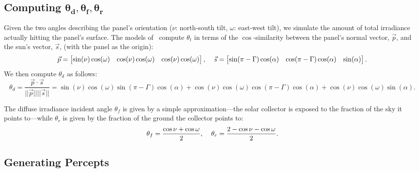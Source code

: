 \documentclass{article}
\begin{document}
\subsection{Computing $\pmb{\theta_d, \theta_f, \theta_r}$}
Given the two angles describing the panel's orientation ($\nu$: north-south tilt, $\omega$: east-west tilt), we simulate the amount of total irradiance actually hitting the panel's surface. The models of~\citet{masters2013renewable} compute $\theta_t$ in terms of the $\cos$-similarity between the panel's normal vector, $\vec{p}$, and the sun's vector, $\vec{s}$, (with the panel as the origin):
\begin{align}
\vec{p} = \begin{bmatrix} \sin(\nu)  \cos(\omega)& \cos(\nu)  \cos(\omega)& \cos(\nu) \cos(\omega) \end{bmatrix}, \hspace{4mm} \vec{s} = \begin{bmatrix} \sin(\pi - \Gamma)  \cos(\alpha)& \cos(\pi - \Gamma)  \cos(\alpha)& \sin(\alpha) \end{bmatrix}.
\end{align}
We then compute $\theta_d$ as follows:
\begin{equation}
\theta_d = \frac{\vec{p} \cdot \vec{s}}{||\vec{p}|| ||\vec{s} ||} = \sin(\nu)  \cos(\omega)  \sin(\pi - \Gamma)  \cos(\alpha) + \cos(\nu)  \cos(\omega)  \cos(\pi - \Gamma)  \cos(\alpha) +  \cos(\nu) \cos(\omega)  \sin(\alpha). 
\end{equation}

The diffuse irradiance incident angle $\theta_f$ is given by a simple approximation---the solar collector is exposed to the fraction of the sky it points to---while $\theta_r$ is given by the fraction of the ground the collector points to:
\begin{equation}
\theta_f = \frac{\cos \nu + \cos \omega}{2}, \hspace{4mm} \theta_r = \frac{2 - \cos\nu - \cos \omega}{2}.
\end{equation}
\subsection{Generating Percepts}
\end{document}
